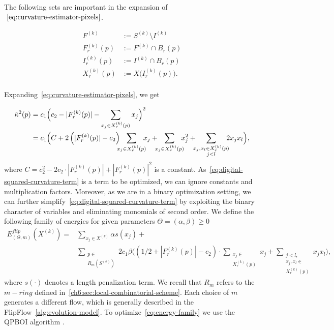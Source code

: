 The following sets are important in the expansion of $~\cref{eq:curvature-estimator-pixels}$.


\begin{align*}
	F^{(k)} &:= S^{(k)} \setminus I^{(k)} \\
	F_r^{(k)}(p) &:= F^{(k)} \cap B_r(p)\\
	I_r^{(k)}(p) &:= I^{(k)} \cap B_r(p) \\
	X_r^{(k)}(p) &:= X\big( I_r^{(k)}(p) \big). \\
\end{align*}


Expanding~\cref{eq:curvature-estimator-pixels}, we get 

\begin{align}
  \hat{\kappa}^2(p) &= c_1\Big( c_2 - |F_{r}^{(k)}(p)| - \sum_{x_j \in X_r^{(k)}(p)} {x_j} \Big)^2 \nonumber \\
   &= c_1 \Big( C + 2\left( |F_{r}^{(k)}(p)| - c_2 \right) \hspace{-2mm}\sum_{x_j \in X_{r}^{(k)}(p)}\hspace{-2mm}{x_j} + \hspace{-2mm}\sum_{x_j \in X_{r}^{(k)}(p)}\hspace{-2mm}{x_j^2} + \hspace{-2mm}\sum_{ \substack{x_j,x_l \in X_{r}^{(k)}(p) \\ j<l} }\hspace{-2mm}{2x_jx_l}  \Big),
   \label{eq:digital-squared-curvature-term}
\end{align}
where $C=c_2^2 - 2c_2 \cdot |F_{r}^{(k)}(p)| + |F_{r}^{(k)}(p)|^2$ is a constant. As~\cref{eq:digital-squared-curvature-term} is a term to be optimized, we can ignore constants and multiplication factors. Moreover, as we are in a binary optimization setting, we can  further simplify~\cref{eq:digital-squared-curvature-term} by exploiting the binary character of variables and eliminating monomials of second order. We define the following family
of energies for given parameters $\Theta=(\alpha,\beta ) \geq 0$
\begin{align}
  E_{(\Theta,m)}^{flip}(X^{(k)}) =& \sum_{x_j \in X^{(k)}}{\alpha s(x_j)} + \nonumber \\ 
  & \sum_{ \substack{p \in \\ R_m(S^{(k)})}}{ 2c_1 \beta  \Big( { (1/2+ |F_{r}^{(k)}(p)|-c_2) \cdot \sum_{ \substack{ x_j \in \\ X_{r}^{(k)}(p)}}{x_j} } + \sum_{ \substack{j<l, \\ x_j,x_l \in \\ X_{r}^{(k)}(p) } }{x_jx_l} \Big) },
  \label{eq:energy-family}
\end{align}
where $s(\cdot)$ denotes a length penalization term. We recall that $R_m$ refers to the $m-ring$ defined in~\cref{ch6:sec:local-combinatorial-scheme}. Each choice of $m$ generates a different flow, which is generally described in the FlipFlow~\cref{alg:evolution-model}. To optimize~\cref{eq:energy-family} we use the QPBOI algorithm \cite{rother07qpbo}.



